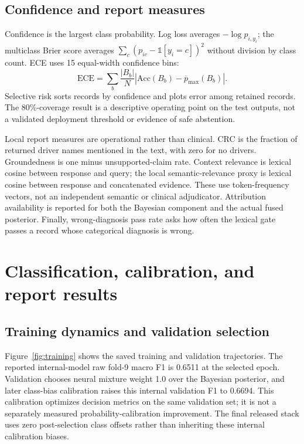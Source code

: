 \subsection{Confidence and report measures}
Confidence is the largest class probability. Log loss averages $-\log p_{i,y_i}$; the multiclass Brier score averages $\sum_c(p_{ic}-\mathbb{1}[y_i=c])^2$ without division by class count. ECE uses 15 equal-width confidence bins:
\begin{equation}
\mathrm{ECE}=\sum_b\frac{|B_b|}{N}\left|\mathrm{Acc}(B_b)-\overline p_{\max}(B_b)\right|.
\end{equation}
Selective risk sorts records by confidence and plots error among retained records. The 80\%-coverage result is a descriptive operating point on the test outputs, not a validated deployment threshold or evidence of safe abstention.

Local report measures are operational rather than clinical. CRC is the fraction of returned driver names mentioned in the text, with zero for no drivers. Groundedness is one minus unsupported-claim rate. Context relevance is lexical cosine between response and query; the local semantic-relevance proxy is lexical cosine between response and concatenated evidence. These use token-frequency vectors, not an independent semantic or clinical adjudicator. Attribution availability is reported for both the Bayesian component and the actual fused posterior. Finally, wrong-diagnosis pass rate asks how often the lexical gate passes a record whose categorical diagnosis is wrong.

\section{Classification, calibration, and report results}
\label{sec:results}
\subsection{Training dynamics and validation selection}
Figure~\ref{fig:training} shows the saved training and validation trajectories. The reported internal-model raw fold-9 macro F1 is 0.6511 at the selected epoch. Validation chooses neural mixture weight 1.0 over the Bayesian posterior, and later class-bias calibration raises this internal validation F1 to 0.6694. This calibration optimizes decision metrics on the same validation set; it is not a separately measured probability-calibration improvement. The final released stack uses zero post-selection class offsets rather than inheriting these internal calibration biases.

